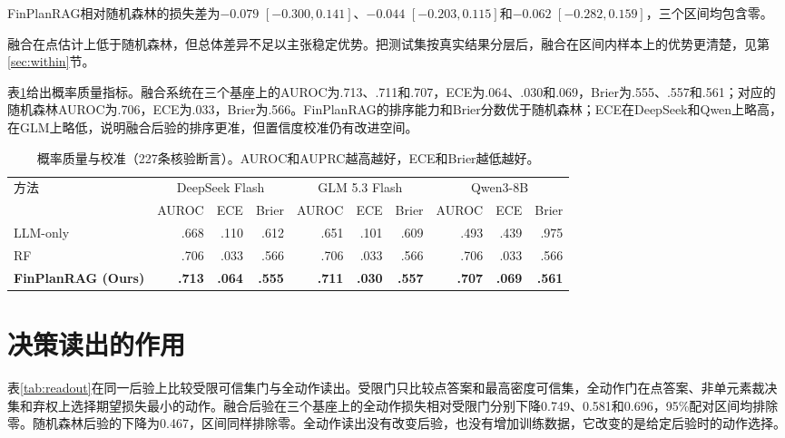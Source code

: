 {\sloppy FinPlanRAG相对随机森林的损失差为$-0.079$ $[-0.300,0.141]$、$-0.044$ $[-0.203,0.115]$和$-0.062$ $[-0.282,0.159]$，三个区间均包含零。\par}融合在点估计上低于随机森林，但总体差异不足以主张稳定优势。把测试集按真实结果分层后，融合在区间内样本上的优势更清楚，见第\ref{sec:within}节。

表\ref{tab:calibration}给出概率质量指标。融合系统在三个基座上的AUROC为.713、.711和.707，ECE为.064、.030和.069，Brier为.555、.557和.561；对应的随机森林AUROC为.706，ECE为.033，Brier为.566。FinPlanRAG的排序能力和Brier分数优于随机森林；ECE在DeepSeek和Qwen上略高，在GLM上略低，说明融合后验的排序更准，但置信度校准仍有改进空间。

\begin{table}[htbp]
\centering
{}
\setlength{\tabcolsep}{4pt}
\caption{概率质量与校准（227条核验断言）。AUROC和AUPRC越高越好，ECE和Brier越低越好。}
\label{tab:calibration}
\begin{tabular}{lrrrrrrrrr}
\toprule
\multirow{2}{*}{方法} & \multicolumn{3}{c}{DeepSeek Flash} & \multicolumn{3}{c}{GLM 5.3 Flash} & \multicolumn{3}{c}{Qwen3-8B} \\
\cmidrule(lr){2-4}\cmidrule(lr){5-7}\cmidrule(lr){8-10}
 & AUROC & ECE & Brier & AUROC & ECE & Brier & AUROC & ECE & Brier \\
\midrule
LLM-only & .668 & .110 & .612 & .651 & .101 & .609 & .493 & .439 & .975 \\
RF & .706 & .033 & .566 & .706 & .033 & .566 & .706 & .033 & .566 \\
\textbf{FinPlanRAG (Ours)} & \textbf{.713} & \textbf{.064} & \textbf{.555} & \textbf{.711} & \textbf{.030} & \textbf{.557} & \textbf{.707} & \textbf{.069} & \textbf{.561} \\
\bottomrule
\end{tabular}
\end{table}

\section{决策读出的作用}

表\ref{tab:readout}在同一后验上比较受限可信集门与全动作读出。受限门只比较点答案和最高密度可信集，全动作门在点答案、非单元素裁决集和弃权上选择期望损失最小的动作。融合后验在三个基座上的全动作损失相对受限门分别下降0.749、0.581和0.696，95\%配对区间均排除零。随机森林后验的下降为0.467，区间同样排除零。全动作读出没有改变后验，也没有增加训练数据，它改变的是给定后验时的动作选择。

